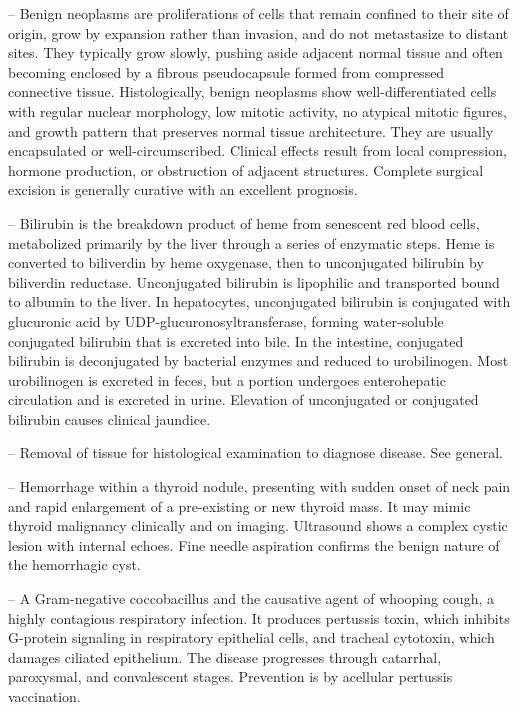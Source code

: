 -- Benign neoplasms are proliferations of cells that remain confined to their site of origin, grow by expansion rather than invasion, and do not metastasize to distant sites. They typically grow slowly, pushing aside adjacent normal tissue and often becoming enclosed by a fibrous pseudocapsule formed from compressed connective tissue. Histologically, benign neoplasms show well-differentiated cells with regular nuclear morphology, low mitotic activity, no atypical mitotic figures, and growth pattern that preserves normal tissue architecture. They are usually encapsulated or well-circumscribed. Clinical effects result from local compression, hormone production, or obstruction of adjacent structures. Complete surgical excision is generally curative with an excellent prognosis.

-- Bilirubin is the breakdown product of heme from senescent red blood cells, metabolized primarily by the liver through a series of enzymatic steps. Heme is converted to biliverdin by heme oxygenase, then to unconjugated bilirubin by biliverdin reductase. Unconjugated bilirubin is lipophilic and transported bound to albumin to the liver. In hepatocytes, unconjugated bilirubin is conjugated with glucuronic acid by UDP-glucuronosyltransferase, forming water-soluble conjugated bilirubin that is excreted into bile. In the intestine, conjugated bilirubin is deconjugated by bacterial enzymes and reduced to urobilinogen. Most urobilinogen is excreted in feces, but a portion undergoes enterohepatic circulation and is excreted in urine. Elevation of unconjugated or conjugated bilirubin causes clinical jaundice.

-- Removal of tissue for histological examination to diagnose disease. See general.

-- Hemorrhage within a thyroid nodule, presenting with sudden onset of neck pain and rapid enlargement of a pre-existing or new thyroid mass. It may mimic thyroid malignancy clinically and on imaging. Ultrasound shows a complex cystic lesion with internal echoes. Fine needle aspiration confirms the benign nature of the hemorrhagic cyst.

-- A Gram-negative coccobacillus and the causative agent of whooping cough, a highly contagious respiratory infection. It produces pertussis toxin, which inhibits G-protein signaling in respiratory epithelial cells, and tracheal cytotoxin, which damages ciliated epithelium. The disease progresses through catarrhal, paroxysmal, and convalescent stages. Prevention is by acellular pertussis vaccination.

